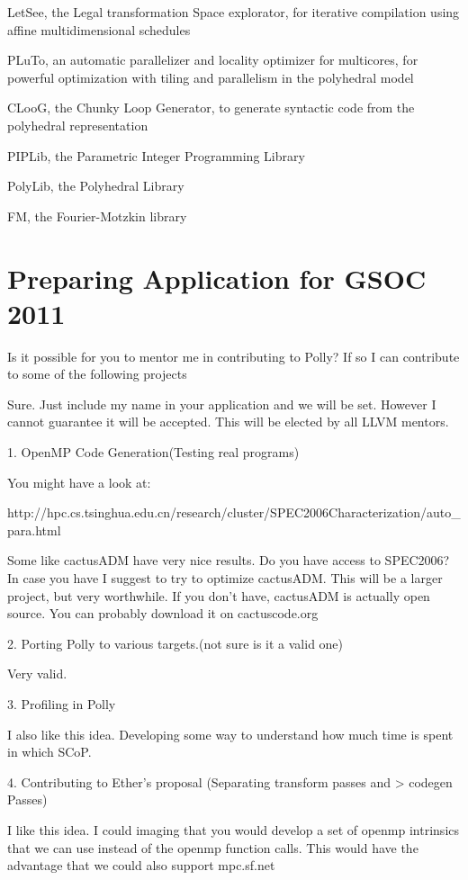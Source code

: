 \documentclass[a4paper,10pt]{article}
\begin{document}
LetSee, the Legal transformation Space explorator, for iterative compilation using affine
  multidimensional schedules

PLuTo, an automatic parallelizer and locality optimizer for multicores, for powerful
  optimization with tiling and parallelism in the polyhedral model

CLooG, the Chunky Loop Generator, to generate syntactic code from the polyhedral
  representation

PIPLib, the Parametric Integer Programming Library

PolyLib, the Polyhedral Library

FM, the Fourier-Motzkin library

\section{Preparing Application for GSOC 2011}
Is it possible for you to mentor me in contributing to Polly? If so I
can contribute to some of the following projects

Sure. Just include my name in your application and we will be set. However I cannot guarantee it will be accepted. This will be elected by all LLVM mentors.

1. OpenMP Code Generation(Testing real programs)

	You might have a look at:

	http://hpc.cs.tsinghua.edu.cn/research/cluster/SPEC2006Characterization/auto\_para.html

	Some like cactusADM have very nice results. Do you have access to SPEC2006? In case you have I suggest to try to optimize cactusADM.
	This will be a larger project, but very worthwhile. If you don't have,
	     cactusADM is actually open source. You can probably download it
		     on cactuscode.org

		     2. Porting Polly to various targets.(not sure is it a valid one)

		     Very valid.

		      3. Profiling in Polly

		     I also like this idea. Developing some way to understand how much time is spent in which SCoP.

		      4. Contributing to Ether's proposal (Separating transform passes and
				     > codegen Passes)

		     I like this idea. I could imaging that you would develop a set of openmp
		     intrinsics that we can use instead of the openmp function calls. This
		     would have the advantage that we could also support mpc.sf.net
\end{document}
